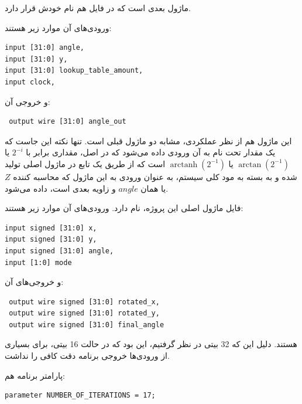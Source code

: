 \documentclass[12pt,titlepage,a4page , tikz , multi,table , svgnames,xcdraw]{article}
\DeclareMathOperator\arctanh{arctanh}
\begin{document}
\hrulefill


ماژول بعدی  است که در فایل هم نام خودش قرار دارد.

 
 ورودی‌های آن موارد زیر هستند:

\begin{latin}
\begin{verbatim}
input [31:0] angle,
input [31:0] y,
input [31:0] lookup_table_amount,
input clock,
\end{verbatim}
\end{latin}

و خروجی آن:

\begin{latin}
\begin{verbatim}
 output wire [31:0] angle_out
\end{verbatim}
\end{latin}

این ماژول هم از نظر عملکردی، مشابه دو ماژول قبلی است. تنها نکته این جاست که یک مقدار تحت نام  به آن ورودی داده می‌شود که در اصل، مقداری برابر با $2^{-i}$ یا $\arctan (2^{-1})$ یا
$\arctanh (2^{-1})$
است که از طریق یک تابع در ماژول اصلی تولید شده و به بسته به مود کلی سیستم، به عنوان ورودی به این ماژول که محاسبه کننده $Z$ یا همان $angle$ و زاویه بعدی است، داده می‌شود.

\hrulefill

فایل ماژول اصلی این پروژه،  نام دارد. ورودی‌های آن موارد زیر هستند:

\begin{latin}
\begin{verbatim}
input signed [31:0] x,
input signed [31:0] y,
input signed [31:0] angle,
input [1:0] mode
\end{verbatim}
\end{latin}

و خروجی‌های آن:

\begin{latin}
\begin{verbatim}
 output wire signed [31:0] rotated_x,
 output wire signed [31:0] rotated_y,
 output wire signed [31:0] final_angle
\end{verbatim}
\end{latin}

هستند. دلیل این که 32 بیتی در نظر گرفتیم، این بود که در حالت 16 بیتی، برای بسیاری از ورودی‌ها خروجی برنامه دقت کافی را نداشت.

پارامتر برنامه هم:

\begin{latin}
\begin{verbatim}
parameter NUMBER_OF_ITERATIONS = 17;
\end{verbatim}
\end{latin}
\end{document}
